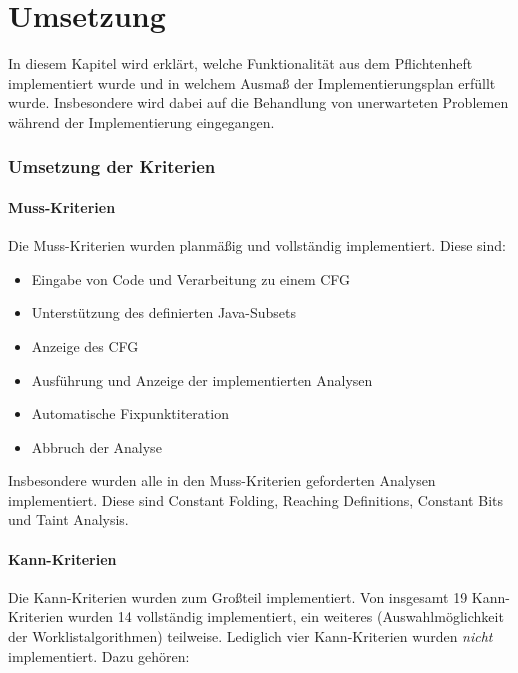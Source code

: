 
\part{Umsetzung}

In diesem Kapitel wird erklärt, welche Funktionalität aus dem Pflichtenheft implementiert wurde und in welchem Ausmaß der Implementierungsplan erfüllt wurde.
Insbesondere wird dabei auf die Behandlung von unerwarteten Problemen während der Implementierung eingegangen.

\section{Umsetzung der Kriterien}

\subsection{Muss-Kriterien}

Die Muss-Kriterien wurden planmäßig und vollständig implementiert. Diese sind:

\begin{itemize}
  \item Eingabe von Code und Verarbeitung zu einem CFG
  \item Unterstützung des definierten Java-Subsets
  \item Anzeige des CFG
  \item Ausführung und Anzeige der implementierten Analysen
  \item Automatische Fixpunktiteration
  \item Abbruch der Analyse 
\end{itemize}

Insbesondere wurden alle in den Muss-Kriterien geforderten Analysen implementiert.
Diese sind Constant Folding, Reaching Definitions, Constant Bits und Taint Analysis.

\subsection{Kann-Kriterien}

Die Kann-Kriterien wurden zum Großteil implementiert.
Von insgesamt 19 Kann-Kriterien wurden 14 vollständig implementiert, ein weiteres (Auswahlmöglichkeit der Worklistalgorithmen) teilweise.
Lediglich vier Kann-Kriterien wurden \textit{nicht} implementiert. Dazu gehören:


